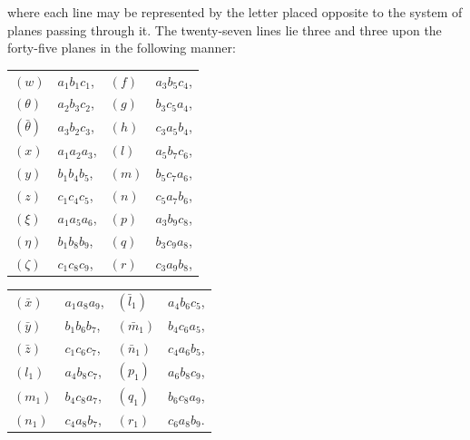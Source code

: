 \documentclass[11pt,a4paper]{book}
\begin{document}
where each line may be represented by the letter placed opposite to the system of planes passing through it. The twenty-seven lines lie three and three upon the forty-five planes in the following manner:
\medskip

\begin{center}
\begin{tabular}{llll}
$(w)$ & $a_1b_1c_1$, & $(f)$ & $a_3b_5c_4$, \\ 
$(\theta)$ & $a_2b_3c_2$, & $(g)$ & $b_3c_5a_4$, \\ 
$(\bar{\theta})$ & $a_3b_2c_3$, & $(h)$ & $c_3a_5b_4$, \\ 
$(x)$ & $a_1a_2a_3$, & $(l)$ & $a_5b_7c_6$, \\ 
$(y)$ & $b_1b_4b_5$, & $(m)$ & $b_5c_7a_6$, \\ 
$(z)$ & $c_1c_4c_5$, & $(n)$ & $c_5a_7b_6$, \\ 
$(\xi)$ & $a_1a_5a_6$, & $(p)$ & $a_3b_9c_8$, \\ 
$(\eta)$ & $b_1b_8b_9$, & $(q)$ & $b_3c_9a_8$, \\ 
$(\zeta)$ & $c_1c_8c_9$, & $(r)$ & $c_3a_9b_8$,
\end{tabular}
\end{center}

\begin{center}
\begin{tabular}{llll}
$(\bar{x})$ & $a_1a_8a_9$, & $(\bar{l}_1)$ & $a_4b_6c_5$, \\ 
$(\bar{y})$ & $b_1b_6b_7$, & $(\bar{m}_1)$ & $b_4c_6a_5$, \\ 
$(\bar{z})$ & $c_1c_6c_7$, & $(\bar{n}_1)$ & $c_4a_6b_5$, \\ 
$(l_1)$ & $a_4b_8c_7$, & $(p_1)$ & $a_6b_8c_9$, \\ 
$(m_1)$ & $b_4c_8a_7$, & $(q_1)$ & $b_6c_8a_9$, \\ 
$(n_1)$ & $c_4a_8b_7$, & $(r_1)$ & $c_6a_8b_9$.
\end{tabular}
\end{center}
\end{document}
